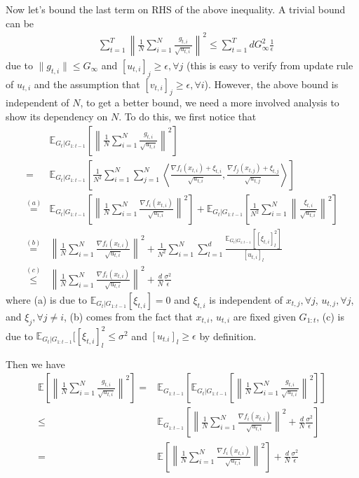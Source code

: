 \documentclass{article} %
\begin{document}
Now let's bound the last term on RHS of the above inequality. A trivial bound can be
\begin{align}
& \sum_{t=1}^T \left\| \frac{1}{N} \sum_{i=1}^N \frac{g_{t,i}}{\sqrt{u_{t,i}}} \right\|^2 \nonumber 
\leq  \sum_{t=1}^T d G_{\infty}^2 \frac{1}{\epsilon} 
\end{align}
due to $\|g_{t,i}\| \leq G_{\infty}$ and $[u_{t,i}]_j \geq \epsilon, \forall j$ (this is easy to verify from update rule of  $u_{t,i}$ and the assumption that $[v_{t,i}]_j \geq \epsilon, \forall i$). However, the above bound is independent of $N$, to get a better bound, we need a more involved analysis to show its dependency on $N$. To do this, we first notice that
\begin{align}
&\mathbb E_{G_t| G_{1:t-1}} \left[ \left\| \frac{1}{N} \sum_{i=1}^N \frac{g_{t,i}}{\sqrt{u_{t,i}}} \right\|^2 \right] \nonumber \\
= & \mathbb E_{G_t| G_{1:t-1}} \left[  \frac{1}{N^2} \sum_{i=1}^N 
\sum_{j=1}^N \left \langle \frac{\nabla f_i(x_{t,i}) + \xi_{t,i }}{\sqrt{u_{t,i}}}, \frac{\nabla f_j(x_{t,j}) + \xi_{t,j }}{\sqrt{u_{t,j}}} \right \rangle \right] \nonumber \\
\overset{(a)}{=}&\mathbb E_{G_t| G_{1:t-1}} \left[ \left\| \frac{1}{N} \sum_{i=1}^N \frac{\nabla f_i(x_{t,i})}{\sqrt{u_{t,i}}} \right\|^2 \right]  +  \mathbb E_{G_t| G_{1:t-1}} \left[  \frac{1}{N^2} \sum_{i=1}^N
\left \| \frac{ \xi_{t,i }}{\sqrt{u_{t,i}}}\right \|^2 \right] \nonumber \\
\overset{(b)}{=}&  \left\| \frac{1}{N} \sum_{i=1}^N \frac{\nabla f_i(x_{t,i})}{\sqrt{u_{t,i}}} \right\|^2   +  \frac{1}{N^2} \sum_{i=1}^N  \sum_{l=1}^d
\frac{ \mathbb E_{G_t| G_{1:t-1}} [[\xi_{t,i}]_l^2] }{[u_{t,i}]_l}  \nonumber \\
\overset{(c)}{\leq} & \left\| \frac{1}{N} \sum_{i=1}^N \frac{\nabla f_i(x_{t,i})}{\sqrt{u_{t,i}}} \right\|^2   +    \frac{d}{N}  
\frac{ \sigma^2 }{\epsilon} 
\end{align}
where (a) is due to $\mathbb E_{G_t | G_{1:t-1}} [\xi_{t,i}] = 0 $ and $\xi_{t,i}$ is independent of $x_{t,j}, \forall j$, $u_{t,j}, \forall j$, and $ \xi_{j}, \forall j \neq i$, (b) comes from the fact that $x_{t,i}$, $u_{t,i}$ are fixed given $G_{1:t}$, (c) is due to $\mathbb E_{G_t| G_{1:t-1}} [[\xi_{t,i}]_l^2 \leq \sigma^2$ and $[u_{t.i}]_l \geq \epsilon$ by definition.

Then we have 
\begin{align}\label{eq: split_var}
\mathbb E\left[ \left\| \frac{1}{N} \sum_{i=1}^N \frac{g_{t,i}}{\sqrt{u_{t,i}}} \right\|^2 \right] =  & \mathbb E_{ G_{1:t-1}} \left[ \mathbb E_{G_t| G_{1:t-1}} \left[ \left\| \frac{1}{N} \sum_{i=1}^N \frac{g_{t,i}}{\sqrt{u_{t,i}}} \right\|^2 \right] \right] \nonumber \\
\leq & \mathbb E_{ G_{1:t-1}} \left[  \left\| \frac{1}{N} \sum_{i=1}^N \frac{\nabla f_i(x_{t,i})}{\sqrt{u_{t,i}}} \right\|^2   +    \frac{d}{N}  
\frac{ \sigma^2 }{\epsilon} \right] \nonumber \\
= &  \mathbb E \left[  \left\| \frac{1}{N} \sum_{i=1}^N \frac{\nabla f_i(x_{t,i})}{\sqrt{u_{t,i}}} \right\|^2     \right] + \frac{d}{N}  
\frac{ \sigma^2 }{\epsilon} 
\end{align}
\end{document}

